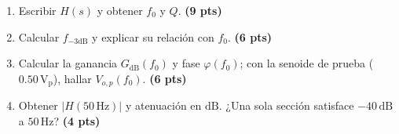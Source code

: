 \documentclass[10pt, a4paper]{article}
\begin{document}
\begin{enumerate}
    \setlength{\itemsep}{2pt}
    \item Escribir $H(s)$ y obtener $f_0$ y $Q$. \hfill \textbf{(9 pts)}
    \item Calcular $f_{-3\mathrm{dB}}$ y explicar su relación con $f_0$. \hfill \textbf{(6 pts)}
    \item Calcular la ganancia $G_{\mathrm{dB}}(f_0)$ y fase $\varphi(f_0)$; con la senoide de prueba ($0.50\,\mathrm{V_p}$), hallar $V_{o,p}(f_0)$. \hfill \textbf{(6 pts)}
    \item Obtener $|H(50\,\mathrm{Hz})|$ y atenuación en $\mathrm{dB}$. ¿Una sola sección satisface $-40\,\mathrm{dB}$ a $50\,\mathrm{Hz}$? \hfill \textbf{(4 pts)}
\end{enumerate}
\end{document}
